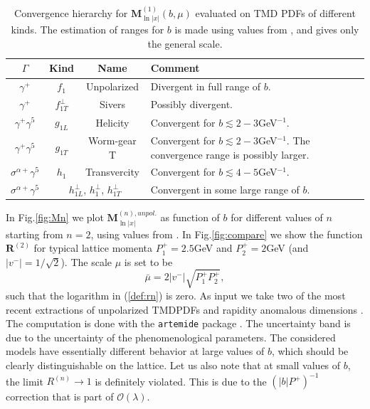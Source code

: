 \documentclass[a4paper, amsfonts, amssymb, amsmath, reprint, showkeys, nofootinbib, twoside]{revtex4-1}
\renewcommand{\(}{\left(}
\renewcommand{\)}{\right)}
\renewcommand{\[}{\left[}
\renewcommand{\]}{\right]}
\begin{document}
\begin{table}
\begin{tabular}{|c|c|c||l|}
 $\Gamma$ & Kind & Name & Comment
\\\hline
$\gamma^+$ & $f_1$ &  Unpolarized & Divergent in full range of $b$.
\\\hline
$\gamma^+$ & $f_{1T}^\perp$ &  Sivers & Possibly divergent.
\\\hline
$\gamma^+\gamma^5$ & $g_{1L}$ &  Helicity & Convergent for $b\lesssim 2-3$GeV$^{-1}$.
\\\hline
$\gamma^+\gamma^5$ & $g_{1T}$ &  Worm-gear T & Convergent for $b\lesssim 2-3$GeV$^{-1}$. The convergence range  is possibly larger.
\\\hline
$\sigma^{\alpha+}\gamma^5$ & $h_{1}$ &  Transvercity & Convergent for $b\lesssim 4-5$GeV$^{-1}$.
\\\hline
$\sigma^{\alpha+}\gamma^5$ & \multicolumn{2}{|c||}{$h_{1L}^\perp$, $h_1^\perp$, $h_{1T}^\perp$} & Convergent in some large range of $b$.
\end{tabular}
\caption{\label{table} Convergence hierarchy for $\mathbf{M}^{(1)}_{\ln|x|}(b,\mu)$ evaluated on TMD PDFs of different kinds. The estimation of ranges for $b$ is made using values from \cite{Kovchegov:2016zex,Kovchegov:2018zeq,Scimemi:2019cmh}, and gives only the  general scale.}
\end{table}

In Fig.\ref{fig:Mn} we plot $\mathbf{M}^{(n),unpol.}_{\ln|x|}$ as function of $b$ for different values of $n$ starting from $n=2$, using values from \cite{Scimemi:2019cmh}.  In Fig.\ref{fig:compare} we show the function $\mathbf{R}^{(2)}$ for typical lattice momenta $P_1^+=2.5$GeV and $P_2^+=2$GeV (and $|v^-|=1/\sqrt{2}$). The scale $\mu$ is set to be
$$\bar \mu=2|v^-|\sqrt{P_1^+P_2^+},$$
such that the logarithm in (\ref{def:rn}) is zero. As input we take two of the most recent extractions of unpolarized TMDPDFs and rapidity anomalous dimensions \cite{Scimemi:2019cmh,Bacchetta:2019sam}. The computation is done with the \texttt{artemide} package \cite{Scimemi:2017etj}. The uncertainty band is due to the uncertainty of the phenomenological parameters. The considered models have essentially different behavior at large values of $b$, which should be clearly distinguishable on the lattice. Let us also note that at small values of $b$,  the limit $R^{(n)}\to1$ is definitely violated. This is due to the $(|b|P^+)^{-1}$ correction that is part of $\mathcal{O}(\lambda)$.
\end{document}
